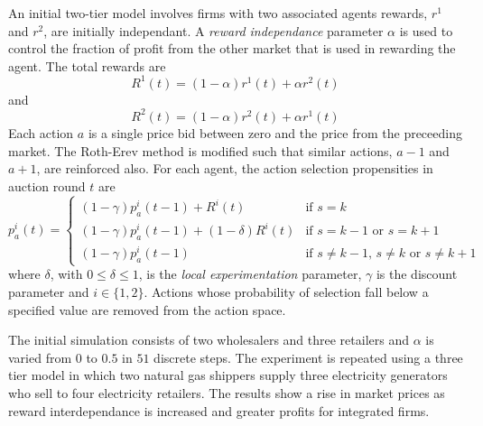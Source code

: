 An initial two-tier model involves firms with two associated agents rewards,
$r^1$ and $r^2$, are initially independant.  A \textit{reward independance}
parameter $\alpha$ is used to control the fraction of profit from the other
market that is used in rewarding the agent.  The total rewards are
\begin{equation}
R^1(t) = (1-\alpha)r^1(t) + \alpha r^2(t)
\end{equation}
and
\begin{equation}
R^2(t) = (1-\alpha)r^2(t) + \alpha r^1(t)
\end{equation}
Each action $a$ is a single price bid between zero and the price from the
preceeding market.  The Roth-Erev method is modified such that similar
actions, $a-1$ and $a+1$, are reinforced also.  For each agent, the action
selection propensities in auction round $t$ are
\begin{equation}
p^i_a(t) = \begin{cases}
(1-\gamma)p^i_a(t-1) + R^i(t)& \text{if $s=k$}\\
(1-\gamma)p^i_a(t-1) + (1-\delta)R^i(t)& \text{if $s=k-1$ or $s=k+1$}\\
(1-\gamma)p^i_a(t-1)& \text{if $s\neq k-1$, $s\neq k$ or $s\neq k+1$}
\end{cases}
\end{equation}
where $\delta$, with $0\leq \delta \leq 1$, is the \textit{local
experimentation} parameter, $\gamma$ is the discount parameter and $i\in \lbrace
1,2 \rbrace$.  Actions whose probability of selection fall below a specified
value are removed from the action space.

The initial simulation consists of two wholesalers and three retailers and
$\alpha$ is varied from $0$ to $0.5$ in $51$ discrete steps.  The experiment
is repeated using a three tier model in which two natural gas shippers supply
three electricity generators who sell to four electricity retailers.  The
results show a rise in market prices as reward interdependance is increased and
greater profits for integrated firms.



